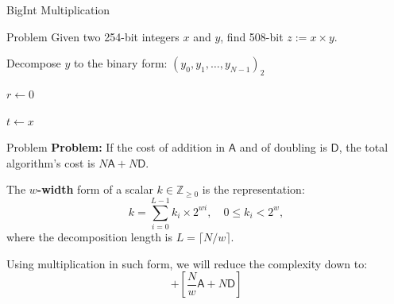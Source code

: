 \documentclass{zkdl-presentation-template}
\begin{document}
    \begin{frame}[fragile]{BigInt Multiplication}
        \begin{block}{Problem}
            Given two 254-bit integers $x$ and $y$, find 508-bit $z := x \times y$.\pause
        \end{block}

        \small
        \begin{algorithm}[H]
          \caption{Double-and-add method for integer multiplication}\label{alg:double_and_add}
          
          Decompose $y$ to the binary form: $(y_0,y_1,\dots,y_{N-1})_2$
          
          $r \gets 0$
          
          $t \gets x$
          
          
          
        \end{algorithm}
    \end{frame}

    \begin{frame}{Problem}
        \textbf{Problem:} If the cost of addition in $\mathsf{A}$ and of
        doubling is $\mathsf{D}$, the total algorithm's cost is
        $N\mathsf{A}+N\mathsf{D}$.\pause
        \begin{definition}
            The \textbf{$w$-width} form of a scalar $k \in \mathbb{Z}_{\geq 0}$
            is the representation:
            \begin{equation*}
                k = \sum_{i=0}^{L-1}k_i \times 2^{wi}, \quad 0 \leq k_i < 2^w,
            \end{equation*}
            where the decomposition length is $L = \lceil N/w \rceil$.\pause
        \end{definition}
        Using multiplication in such form, we will reduce the complexity down to:
        \begin{equation*}
            [2^{w-1}\mathsf{A}+2^{w-1}\mathsf{D}] + \left[\frac{N}{w}\mathsf{A}+N\mathsf{D}\right]
        \end{equation*}
    \end{frame}
\end{document}
